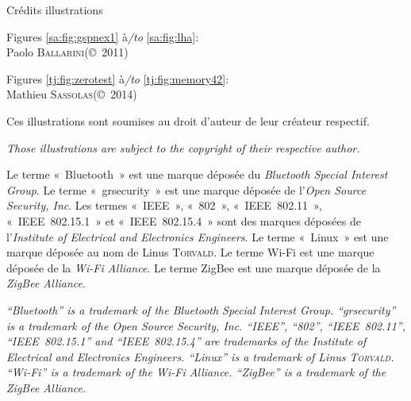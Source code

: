 \cleardoublepage
\thispagestyle{empty}

\setlength{\oddsidemargin}{79pt}
\setlength{\marginparsep}{0pt}
\setlength{\marginparwidth}{0pt}
\setlength{\marginparpush}{0pt}
\setlength{\hsize}{\paperwidth}
\addtolength{\hsize}{-\oddsidemargin}
\addtolength{\hsize}{-\oddsidemargin}
\addtolength{\hsize}{-2in}

\begin{center}
\begin{minipage}{.6\textwidth}
\centering
{\Large Crédits illustrations}

\vspace{1.5cm}
Figures \ref{sa:fig:gspnex1} à\textit{/to} \ref{sa:fig:lha}:\\
Paolo \textsc{Ballarini}\quad(©~2011)
\medskip

Figures \ref{tj:fig:zerotest} à\textit{/to} \ref{tj:fig:memory42}:\\
Mathieu \textsc{Sassolas}\quad(©~2014)

\bigskip
Ces illustrations sont soumises au droit d'auteur de leur créateur respectif.

\medskip
\textit{Those illustrations are subject to the copyright of their respective author.}
\end{minipage}
\end{center}

\vfill

\begin{small}
Le terme « Bluetooth » est une marque déposée du \textit{Bluetooth Special Interest Group}.
Le terme « grsecurity » est une marque déposée de l'\textit{Open Source Security, Inc}.
Les termes « IEEE », « 802 », « IEEE~802.11 », « IEEE~802.15.1 » et « IEEE~802.15.4 » sont des marques déposées de l'\textit{Institute of Electrical and Electronics Engineers}.
Le terme « Linux » est une marque déposée au nom de Linus \textsc{Torvald}.
Le terme Wi-Fi est une marque déposée de la \textit{Wi-Fi Alliance}.
Le terme ZigBee est une marque déposée de la \textit{ZigBee Alliance}.
\medskip

{\it
“Bluetooth” is a trademark of the Bluetooth Special Interest Group.
“grsecurity” is a trademark of the Open Source Security, Inc.
“IEEE”, “802”, “IEEE~802.11”, “IEEE~802.15.1” and “IEEE~802.15.4” are trademarks of the Institute of Electrical and Electronics Engineers.
“Linux” is a trademark of Linus \textsc{Torvald}.
“Wi-Fi” is a trademark of the Wi-Fi Alliance.
“ZigBee” is a trademark of the ZigBee Alliance.
}
\end{small}

